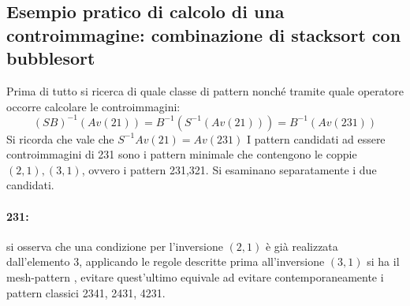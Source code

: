 \subsection{Esempio pratico di calcolo di una controimmagine: combinazione di stacksort con bubblesort}
Prima di tutto si ricerca di quale classe di pattern nonch\'e tramite quale operatore occorre calcolare le controimmagini:
$$(SB)^{-1}(Av(21)) = B^{-1}(S^{-1}(Av(21)))=B^{-1}(Av(231))$$
Si ricorda che vale che $S^{-1}Av(21) = Av(231)$
I pattern candidati ad essere controimmagini di 231 sono i pattern minimale che contengono le coppie $(2,1),(3,1)$, ovvero i pattern 231,321. Si esaminano separatamente i due candidati.
\paragraph*{231:} si osserva che una condizione per l'inversione $(2,1)$ \`e gi\`a realizzata dall'elemento $3$, applicando le regole descritte prima all'inversione $(3,1)$ si ha il mesh-pattern , evitare quest'ultimo equivale ad evitare contemporaneamente i pattern classici 2341, 2431, 4231.
